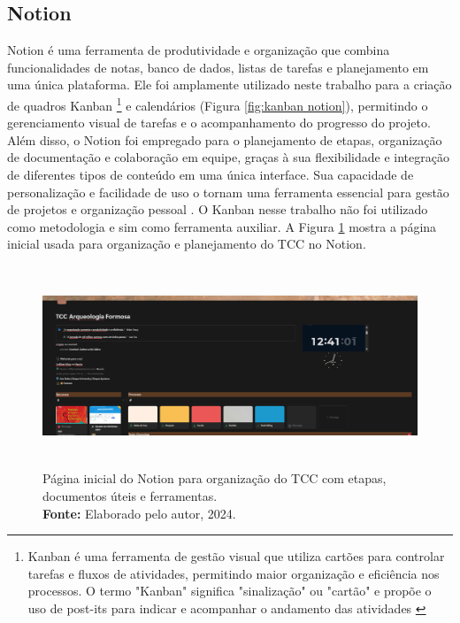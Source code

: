 \subsection{Notion}
 Notion é uma ferramenta de produtividade e organização que combina funcionalidades de notas, banco de dados, listas de tarefas e planejamento em uma única plataforma. Ele foi amplamente utilizado neste trabalho para a criação de quadros Kanban \footnote{Kanban é uma ferramenta de gestão visual que utiliza cartões para controlar tarefas e fluxos de atividades, permitindo maior organização e eficiência nos processos. O termo "Kanban" significa "sinalização" ou "cartão" e propõe o uso de post-its para indicar e acompanhar o andamento das atividades \citep{aguiar2007compreendendo}} e calendários (Figura \ref{fig:kanban notion}), permitindo o gerenciamento visual de tarefas e o acompanhamento do progresso do projeto. Além disso, o Notion foi empregado para o planejamento de etapas, organização de documentação e colaboração em equipe, graças à sua flexibilidade e integração de diferentes tipos de conteúdo em uma única interface. Sua capacidade de personalização e facilidade de uso o tornam uma ferramenta essencial para gestão de projetos e organização pessoal \citep{notion}.
 O Kanban nesse trabalho não foi utilizado como metodologia e sim como ferramenta auxiliar.
 A Figura \ref{fig:notion inicial} mostra a página inicial usada para organização e planejamento do TCC no Notion.

\begin{figure}[H]
    \centering
    \includegraphics[height=6cm, keepaspectratio]{img/Notion/pagina inicial.png}
    \caption{ Página inicial do Notion para organização do TCC com etapas, \\ documentos úteis e ferramentas. \\
        \textbf{Fonte:} Elaborado pelo autor, 2024.}
    \label{fig:notion inicial}
\end{figure}

